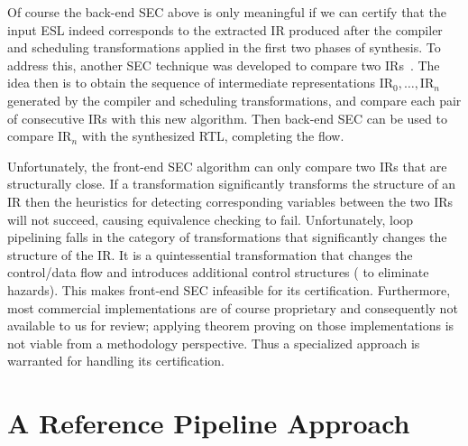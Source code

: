 \medskip

 Of course the back-end SEC
above is only meaningful if we can certify that the input
ESL indeed corresponds to the extracted IR produced after
the compiler and scheduling transformations applied in the
first two phases of synthesis. To address this, another SEC
technique was developed to compare two IRs~\cite{zhenkun:iccd-13}.  The idea then
is to obtain the sequence of intermediate representations
$\mbox{IR}_0,\ldots,\mbox{IR}_n$ generated by the compiler
and scheduling transformations, and compare each pair of
consecutive IRs with this new algorithm.  Then back-end SEC
can be used to compare $\mbox{IR}_n$ with the synthesized
RTL, completing the flow.

\bigskip

 Unfortunately, the front-end SEC
algorithm can only compare two IRs that are structurally close.  If a
transformation significantly transforms the structure of an IR then
the heuristics for detecting corresponding variables between the two
IRs will not succeed, causing equivalence checking to fail.
Unfortunately, loop pipelining falls in the category of
transformations that significantly changes the structure of the IR.
It is a quintessential transformation that changes the control/data
flow and introduces additional control structures (%
to eliminate
hazards).  This makes front-end SEC infeasible for its certification.
Furthermore, most commercial implementations are of course
proprietary and consequently not available to us for review; applying
theorem proving on those implementations is not viable from a
methodology perspective.  Thus a specialized approach is warranted for
handling its certification.

\section{A Reference Pipeline Approach}
\label{subsec:reference-pipeline}

